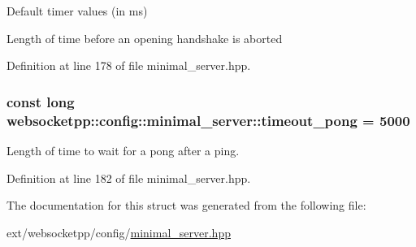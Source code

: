 Default timer values (in ms) 

Length of time before an opening handshake is aborted 

Definition at line 178 of file minimal\+\_\+server.\+hpp.

\hypertarget{structwebsocketpp_1_1config_1_1minimal__server_ad1b8ef6ef509976f2d5e05840d641626}{}
\subsubsection[{timeout\+\_\+pong}]{\setlength{\rightskip}{0pt plus 5cm}const long websocketpp\+::config\+::minimal\+\_\+server\+::timeout\+\_\+pong = 5000\hspace{0.3cm}{\ttfamily [static]}}\label{structwebsocketpp_1_1config_1_1minimal__server_ad1b8ef6ef509976f2d5e05840d641626}


Length of time to wait for a pong after a ping. 



Definition at line 182 of file minimal\+\_\+server.\+hpp.



The documentation for this struct was generated from the following file\+:\begin{DoxyCompactItemize}
\item 
ext/websocketpp/config/\hyperlink{minimal__server_8hpp}{minimal\+\_\+server.\+hpp}\end{DoxyCompactItemize}

